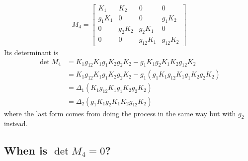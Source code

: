 \begin{align}
	M_4 = \begin{bmatrix}
	K_1 & K_2 & 0 & 0 \\
	g_1 K_1 & 0 & 0 & g_1 K_2\\
	0 & g_2 K_2 & g_2 K_1 & 0\\
	0 & 0 & g_{12}K_1 & g_{12} K_2
	\end{bmatrix}
\end{align}
Its determinant is
\begin{align}
	\det M_4 &= K_1 g_{12}K_1 g_1K_2g_2K_2 -g_1K_1g_2K_1K_2g_{12}K_2\\
	& = K_1 g_{12}K_1 g_1K_2g_2K_2  -g_1(g_1K_1g_{12}K_1g_1K_2g_{2}K_2)\\
	&=\Delta_1  (K_1 g_{12}K_1 g_1K_2g_2K_2)\\
	&=\Delta_2 (g_1 K_1 g_2 K_1K_2 g_{12} K_2 )
\end{align}
where the last form comes from doing the process in the same way but with $g_2$ instead.

\subsection{When is $\det M_4 = 0$?}

